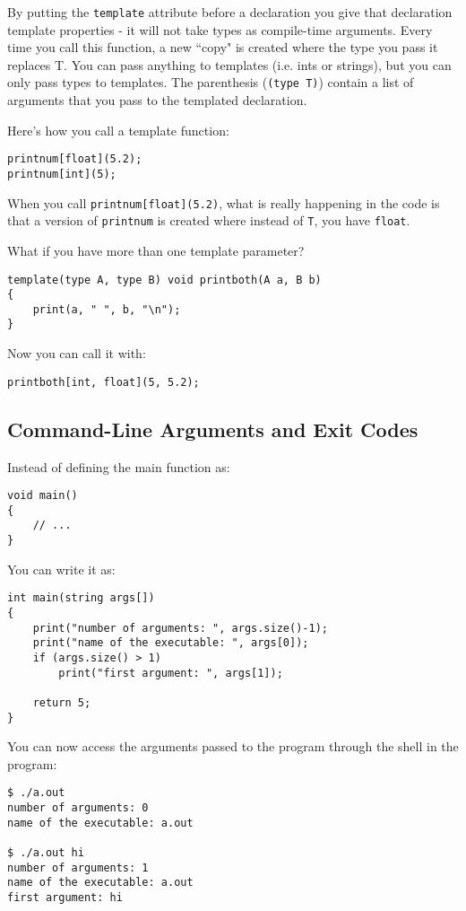 \documentclass[10pt,a4paper]{article}
\begin{document}
By putting the \verb|template| attribute before a declaration you give that declaration template properties - it will not take types as compile-time arguments. Every time you call this function, a new ``copy" is created where the type you pass it replaces T. You can pass anything to templates (i.e. ints or strings), but you can only pass types to templates. The parenthesis (\verb|(type T)|) contain a list of arguments that you pass to the templated declaration.

Here's how you call a template function:
\begin{verbatim}
printnum[float](5.2);
printnum[int](5);
\end{verbatim}

When you call \verb|printnum[float](5.2)|, what is really happening in the code is that a version of \verb|printnum| is created where instead of \verb|T|, you have \verb|float|.

What if you have more than one template parameter?
\begin{verbatim}
template(type A, type B) void printboth(A a, B b)
{
    print(a, " ", b, "\n");
}
\end{verbatim}

Now you can call it with:
\begin{verbatim}
printboth[int, float](5, 5.2);
\end{verbatim}

\newpage





\subsection{Command-Line Arguments and Exit Codes}
Instead of defining the main function as:
\begin{verbatim}
void main()
{
    // ...
}
\end{verbatim}

You can write it as:
\begin{verbatim}
int main(string args[])
{
    print("number of arguments: ", args.size()-1);
    print("name of the executable: ", args[0]);
    if (args.size() > 1)
        print("first argument: ", args[1]);

    return 5;
}
\end{verbatim}

You can now access the arguments passed to the program through the shell in the program:
\begin{verbatim}
$ ./a.out
number of arguments: 0
name of the executable: a.out

$ ./a.out hi
number of arguments: 1
name of the executable: a.out
first argument: hi
\end{verbatim}
\end{document}
